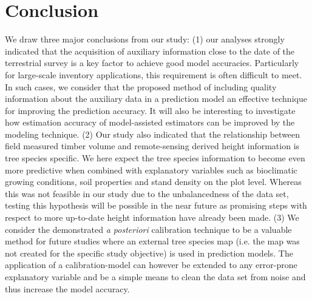 \section{Conclusion}
\label{sec:concl}

We draw three major conclusions from our study: (1) our analyses strongly indicated that the acquisition of auxiliary information close to the date of the terrestrial survey is a key factor to achieve good model accuracies. Particularly for large-scale inventory applications, this requirement is often difficult to meet. In such cases, we consider that the proposed method of including quality information about the auxiliary data in a prediction model an effective technique for improving the prediction accuracy. It will also be interesting to investigate how estimation accuracy of model-assisted estimators can be improved by the modeling technique. (2) Our study also indicated that the relationship between field measured timber volume and remote-sensing derived height information is tree species specific. We here expect the tree species information to become even more predictive when combined with explanatory variables such as bioclimatic growing conditions, soil properties and stand density on the plot level. Whereas this was not feasible in our study due to the unbalancedness of the data set, testing this hypothesis will be possible in the near future as promising steps with respect to more up-to-date height information have already been made. (3) We consider the demonstrated \textit{a posteriori} calibration technique to be a valuable method for future studies where an external tree species map (i.e. the map was not created for the specific study objective) is used in prediction models. The application of a calibration-model can however be extended to any error-prone explanatory variable and be a simple means to clean the data set from noise and thus increase the model accuracy.\\

%
%

